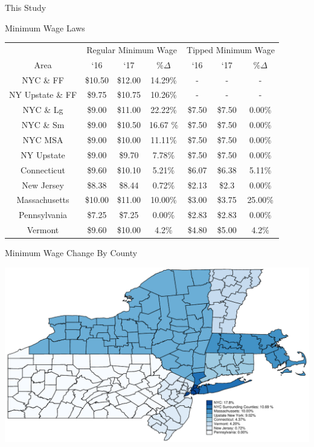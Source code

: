 \documentclass[xcolor=table]{beamer}
\begin{document}
\begin{spacing}{1.2}
\begin{frame}{This Study}
\begin{itemize}
\end{itemize}
\end{frame}





\begin{frame}[label=main]{Minimum Wage Laws}
\footnotesize
\centering
\begin{tabular}{ c c c c c c c} \\ \hline \hline
&  \multicolumn{3}{c}{Regular Minimum Wage} & \multicolumn{3}{c}{Tipped Minimum Wage}\\
 Area & `16  & `17  & $\% \Delta$ & `16 & `17 &  $\% \Delta$  \\ \hline \hline
 NYC \& FF & \$10.50 & \$12.00 & 14.29\%& - & - & - \\
 NY Upstate \& FF  & \$9.75 & \$10.75 & 10.26\% & - & -& - \\
NYC \& Lg & \$9.00 & \$11.00 & 22.22\% & \$7.50 & \$7.50 & 0.00\%\\
NYC \& Sm & \$9.00 & \$10.50 & 16.67 \% & \$7.50 & \$7.50 & 0.00\%\\
NYC MSA & \$9.00 & \$10.00 & 11.11\% & \$7.50 & \$7.50 & 0.00\%\\
NY Upstate & \$9.00 & \$9.70 & 7.78\% & \$7.50 & \$7.50  & 0.00\% \\
Connecticut & \$9.60 & \$10.10 & 5.21\% & \$6.07 & \$6.38 & 5.11\% \\
New Jersey &  \$8.38 & \$8.44 & 0.72\%  & \$2.13 & \$2.3 & 0.00\% \\
Massachusetts & \$10.00 & \$11.00 & 10.00\% & \$3.00 & \$3.75  & 25.00\% \\
Pennsylvania &  \$7.25 & \$7.25 & 0.00\% & \$2.83 & \$2.83 & 0.00\% \\
Vermont &  \$9.60 & \$10.00 & 4.2\% & \$4.80 & \$5.00 & 4.2\% \\
\end{tabular}
\raggedleft
\hyperlink{supplemental}{}
\end{frame}




\begin{frame}{Minimum Wage Change By County}

\centering
\includegraphics[scale=.65]{counties.pdf}


\end{frame}
\end{spacing}
\end{document}
